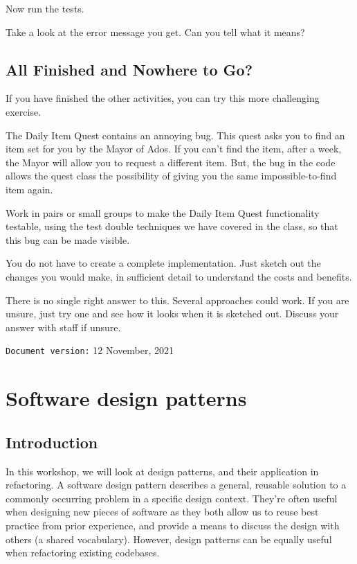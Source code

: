 \documentclass[
]{book}
\begin{document}
Now run the tests.

Take a look at the error message you get. Can you tell what it means?

\hypertarget{next}{%
\section{All Finished and Nowhere to Go?}\label{next}}

If you have finished the other activities, you can try this more challenging exercise.

The Daily Item Quest contains an annoying bug. This quest asks you to find an item set for you by the Mayor of Ados. If you can't find the item, after a week, the Mayor will allow you to request a different item. But, the bug in the code allows the quest class the possibility of giving you the same impossible-to-find item again.

Work in pairs or small groups to make the Daily Item Quest functionality testable, using the test double techniques we have covered in the class, so that this bug can be made visible.

You do not have to create a complete implementation. Just sketch out the changes you would make, in sufficient detail to understand the costs and benefits.

There is no single right answer to this. Several approaches could work. If you are unsure, just try one and see how it looks when it is sketched out. Discuss your answer with staff if unsure.

\texttt{Document\ version:} 12 November, 2021

\hypertarget{patterning}{%
\chapter{Software design patterns}\label{patterning}}

\hypertarget{introduction}{%
\section{Introduction}\label{introduction}}

In this workshop, we will look at design patterns, and their application in refactoring. A software design pattern describes a general, reusable solution to a commonly occurring problem in a specific design context. They're often useful when designing new pieces of software as they both allow us to reuse best practice from prior experience, and provide a means to discuss the design with others (a shared vocabulary). However, design patterns can be equally useful when refactoring existing codebases.
\end{document}

